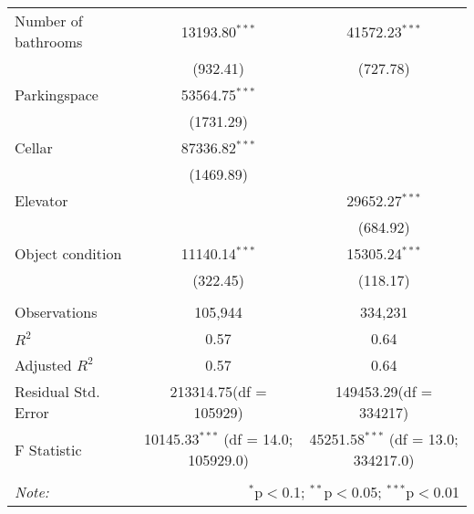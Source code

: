 \begin{table}[!htbp]
\begin{tabular}{@{\extracolsep{5pt}}lcc}
 Number of bathrooms & 13193.80$^{***}$ & 41572.23$^{***}$ \\
  & (932.41) & (727.78) \\
 Parkingspace & 53564.75$^{***}$ & \\
  & (1731.29) & \\
 Cellar & 87336.82$^{***}$ & \\
  & (1469.89) & \\
 Elevator & & 29652.27$^{***}$ \\
  & & (684.92) \\
 Object condition & 11140.14$^{***}$ & 15305.24$^{***}$ \\
  & (322.45) & (118.17) \\
\hline \\[-1.8ex]
 Observations & 105,944 & 334,231 \\
 $R^2$ & 0.57 & 0.64 \\
 Adjusted $R^2$ & 0.57 & 0.64 \\
 Residual Std. Error & 213314.75(df = 105929) & 149453.29(df = 334217)  \\
 F Statistic & 10145.33$^{***}$ (df = 14.0; 105929.0) & 45251.58$^{***}$ (df = 13.0; 334217.0) \\
\hline
\hline \\[-1.8ex]
\textit{Note:} & \multicolumn{2}{r}{$^{*}$p$<$0.1; $^{**}$p$<$0.05; $^{***}$p$<$0.01} \\
\end{tabular}
\end{table}